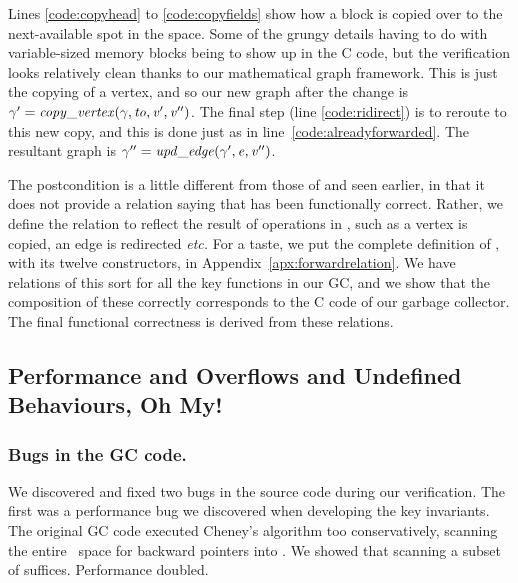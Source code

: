 Lines \ref{code:copyhead} to \ref{code:copyfields} show
how a block is copied over to the next-available spot in the
 space. Some of the grungy details having to do with
variable-sized memory blocks being to show up in the C code,
but the verification looks relatively clean
thanks to our mathematical graph framework.
This is just the copying of a vertex, and so our new graph after the change is
$\gamma' = \mathit{copy\_vertex}(\gamma, \mathit{to}, \mathit{v'}, \mathit{v''})$.
The final step (line \ref{code:ridirect}) is to reroute to this
new copy, and this is done just as in line~\ref{code:alreadyforwarded}. The
resultant graph is $\gamma'' = \mathit{upd\_edge}(\gamma', \mathit{e}, \mathit{v''})$.

The postcondition is a little different from those of 
and  seen earlier, in that it does not provide a relation
saying that  has been functionally correct. Rather, we
define the relation to reflect the result of operations
in , such as a vertex is copied, an edge is redirected
\emph{etc.} For a taste, we put the complete definition
of , with its twelve constructors, 
in Appendix~\ref{apx:forwardrelation}. We
have relations of this sort for all the key functions in our GC, and
we show that the composition of these correctly corresponds to the C
code of our garbage collector. The final functional correctness is
derived from these relations.



\subsection{Performance and Overflows and Undefined Behaviours, Oh My!} \label{sec:gcissues}

\subsubsection*{Bugs in the GC code.}
We discovered and fixed two bugs in the source code during our verification.
The first was a performance bug we discovered when developing the key invariants.
The original GC code executed Cheney's algorithm too conservatively,
scanning the entire~ space for backward pointers into . We
showed that scanning a subset of  suffices.  Performance doubled.

